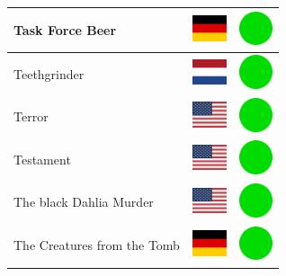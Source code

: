 \documentclass[12pt, a4paper, twoside]{report}
\begin{document}
\begin{center}
\begin{longtable}{|p{5cm}|p{2cm}|p{2cm}|}
 Task Force Beer                                            & \includegraphics[width=1cm]{../4x3/de} &   \includegraphics[width=1cm]{../likes/y} \\ \hline
 Teethgrinder                                               & \includegraphics[width=1cm]{../4x3/nl} &   \includegraphics[width=1cm]{../likes/y} \\ \hline
 Terror                                                     & \includegraphics[width=1cm]{../4x3/us} &   \includegraphics[width=1cm]{../likes/y} \\ \hline
 Testament                                                  & \includegraphics[width=1cm]{../4x3/us} &   \includegraphics[width=1cm]{../likes/y} \\ \hline
 The black Dahlia Murder                                    & \includegraphics[width=1cm]{../4x3/us} &   \includegraphics[width=1cm]{../likes/y} \\ \hline
 The Creatures from the Tomb                                & \includegraphics[width=1cm]{../4x3/de} &   \includegraphics[width=1cm]{../likes/y} \\ \hline

\end{longtable}
\end{center}
\end{document}
